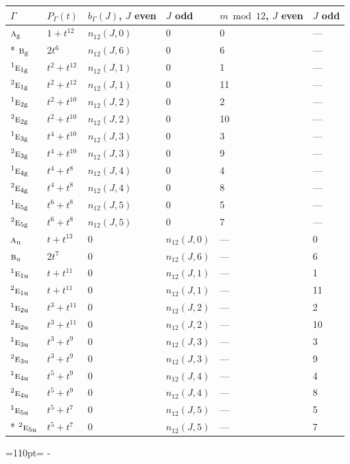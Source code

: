 \documentclass[10pt,a4paper]{article}
\newcommand{\needspace}[1]{\par\penalty-100\begingroup\dimen0=#1\relax\dimen2=\pagegoal
  \advance\dimen2-\pagetotal\ifdim\dimen0>\dimen2\relax\ifdim\dimen2>0pt\vfil\break\fi\fi
  \endgroup}
\numberwithin{equation}{section}
\newcommand{\irr}[1]{\text{\normalfont\scshape #1}}
\newcommand{\conjpair}[1]{{}^{#1}}
\newcommand{\ptag}[1]{\mathrm{#1}}
\begin{document}
{\small\begin{longtable}{@{}llllll@{}}\toprule
$\Gamma$ & $P_\Gamma(t)$ & $b_\Gamma(J)$, $J$ even & $J$ odd & $m \bmod 12$, $J$ even & $J$ odd\\\midrule\endhead
\bottomrule\endfoot\endlastfoot
$\irr{a}_{\ptag{g}}$ & $1 + t^{12}$ & $n_{12}(J,0)$ & $0$ & 0 & ---\\*
$\irr{b}_{\ptag{g}}$ & $2t^{6}$ & $n_{12}(J,6)$ & $0$ & 6 & ---\\
$\conjpair{1}\irr{e}_{1\ptag{g}}$ & $t^{2} + t^{12}$ & $n_{12}(J,1)$ & $0$ & 1 & ---\\
$\conjpair{2}\irr{e}_{1\ptag{g}}$ & $t^{2} + t^{12}$ & $n_{12}(J,1)$ & $0$ & 11 & ---\\
$\conjpair{1}\irr{e}_{2\ptag{g}}$ & $t^{2} + t^{10}$ & $n_{12}(J,2)$ & $0$ & 2 & ---\\
$\conjpair{2}\irr{e}_{2\ptag{g}}$ & $t^{2} + t^{10}$ & $n_{12}(J,2)$ & $0$ & 10 & ---\\
$\conjpair{1}\irr{e}_{3\ptag{g}}$ & $t^{4} + t^{10}$ & $n_{12}(J,3)$ & $0$ & 3 & ---\\
$\conjpair{2}\irr{e}_{3\ptag{g}}$ & $t^{4} + t^{10}$ & $n_{12}(J,3)$ & $0$ & 9 & ---\\
$\conjpair{1}\irr{e}_{4\ptag{g}}$ & $t^{4} + t^{8}$ & $n_{12}(J,4)$ & $0$ & 4 & ---\\
$\conjpair{2}\irr{e}_{4\ptag{g}}$ & $t^{4} + t^{8}$ & $n_{12}(J,4)$ & $0$ & 8 & ---\\
$\conjpair{1}\irr{e}_{5\ptag{g}}$ & $t^{6} + t^{8}$ & $n_{12}(J,5)$ & $0$ & 5 & ---\\
$\conjpair{2}\irr{e}_{5\ptag{g}}$ & $t^{6} + t^{8}$ & $n_{12}(J,5)$ & $0$ & 7 & ---\\
$\irr{a}_{\ptag{u}}$ & $t + t^{13}$ & $0$ & $n_{12}(J,0)$ & --- & 0\\
$\irr{b}_{\ptag{u}}$ & $2t^{7}$ & $0$ & $n_{12}(J,6)$ & --- & 6\\
$\conjpair{1}\irr{e}_{1\ptag{u}}$ & $t + t^{11}$ & $0$ & $n_{12}(J,1)$ & --- & 1\\
$\conjpair{2}\irr{e}_{1\ptag{u}}$ & $t + t^{11}$ & $0$ & $n_{12}(J,1)$ & --- & 11\\
$\conjpair{1}\irr{e}_{2\ptag{u}}$ & $t^{3} + t^{11}$ & $0$ & $n_{12}(J,2)$ & --- & 2\\
$\conjpair{2}\irr{e}_{2\ptag{u}}$ & $t^{3} + t^{11}$ & $0$ & $n_{12}(J,2)$ & --- & 10\\
$\conjpair{1}\irr{e}_{3\ptag{u}}$ & $t^{3} + t^{9}$ & $0$ & $n_{12}(J,3)$ & --- & 3\\
$\conjpair{2}\irr{e}_{3\ptag{u}}$ & $t^{3} + t^{9}$ & $0$ & $n_{12}(J,3)$ & --- & 9\\
$\conjpair{1}\irr{e}_{4\ptag{u}}$ & $t^{5} + t^{9}$ & $0$ & $n_{12}(J,4)$ & --- & 4\\
$\conjpair{2}\irr{e}_{4\ptag{u}}$ & $t^{5} + t^{9}$ & $0$ & $n_{12}(J,4)$ & --- & 8\\
$\conjpair{1}\irr{e}_{5\ptag{u}}$ & $t^{5} + t^{7}$ & $0$ & $n_{12}(J,5)$ & --- & 5\\*
$\conjpair{2}\irr{e}_{5\ptag{u}}$ & $t^{5} + t^{7}$ & $0$ & $n_{12}(J,5)$ & --- & 7\\
\bottomrule\end{longtable}}
\needspace{110pt}
\end{document}

